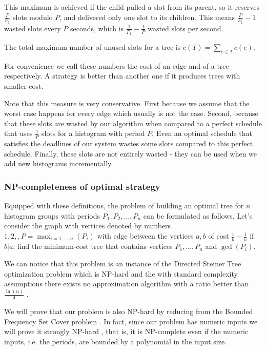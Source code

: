 This maximum is achieved if the child pulled a slot from its parent, so it reserves $\frac P {P_1}$ slots modulo $P$, and delivered only one slot to its children. This means $\frac P {P_1}-1$ wasted slots every $P$ seconds, which is $\frac 1 {P_1}- \frac 1 P$ wasted slots per second. 

\begin{definition}
The total maximum number of unused slots for a tree is $c(T)=\sum_{e\in T}c(e)$. 
\end{definition}

For convenience we call these numbers the cost of an edge and of a tree respectively. A strategy is better than another one if it produces trees with smaller cost. 

Note that this measure is very conservative. First because we assume that the worst case happens for every edge which usually is not the case. Second, because that these slots are wasted by our algorithm when compared to a perfect schedule that uses $\frac 1 P $ slots for a histogram with period $P$. Even an optimal schedule that satisfies the deadlines of our system wastes some slots compared to this perfect schedule. Finally, these slots are not entirely wasted - they can be used when we add new histograms incrementally.

\subsubsection*{NP-completeness of optimal strategy}

Equipped with these definitions, the problem of building an optimal tree for $n$ histogram groups with periods $P_1, P_2, \ldots,P_n$ can be formulated as follows. Let’s consider the graph with vertices denoted by numbers $1,2,,P=\max_{i=1,\ldots,n}(P_i)$ with edge between the vertices $a, b$ of cost $\frac 1 b -\frac 1 a$ if $b \vert a$; find the minimum-cost tree that contains vertices $P_1,\ldots,P_n$ and $\gcd(P_i)$.

We can notice that this problem is an instance of the Directed Steiner Tree optimization problem which is NP-hard and the with standard complexity assumptions there exists no approximation algorithm with a ratio better than $\frac {\ln (n)} 4$ \citep{zelikovsky1997series, ming2006fasterdsp}.

We will prove that our problem is also NP-hard by reducing from the Bounded Frequency Set Cover problem \citep{gary1979computers, cmulecture}. In fact, since our problem has numeric inputs we will prove it strongly NP-hard \citep{garey1978strong}, that is, it is NP-complete even if the numeric inputs, i.e. the periods, are bounded by a polynomial in the input size.

